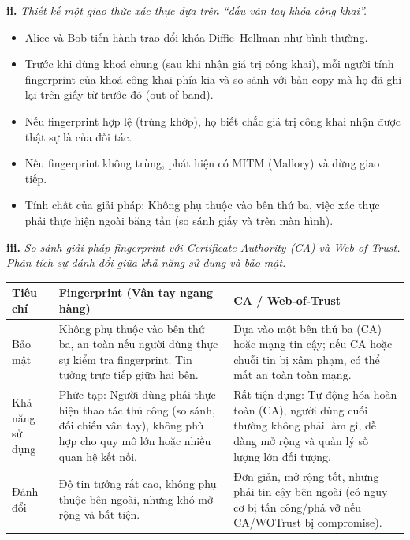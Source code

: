 \textbf{ii.} \textit{Thiết kế một giao thức xác thực dựa trên ``dấu vân tay khóa công khai''.}

\begin{itemize}
    \item Alice và Bob tiến hành trao đổi khóa Diffie–Hellman như bình thường.
    \item Trước khi dùng khoá chung (sau khi nhận giá trị công khai), mỗi người tính fingerprint của khoá công khai phía kia và so sánh với bản copy mà họ đã ghi lại trên giấy từ trước đó (out-of-band).
    \item Nếu fingerprint hợp lệ (trùng khớp), họ biết chắc giá trị công khai nhận được thật sự là của đối tác.
    \item Nếu fingerprint không trùng, phát hiện có MITM (Mallory) và dừng giao tiếp.
    \item Tính chất của giải pháp: Không phụ thuộc vào bên thứ ba, việc xác thực phải thực hiện ngoài băng tần (so sánh giấy và trên màn hình).
\end{itemize}

\textbf{iii.} \textit{So sánh giải pháp fingerprint với Certificate Authority (CA) và Web-of-Trust. Phân tích sự đánh đổi giữa khả năng sử dụng và bảo mật.}

\begin{center}
    \begin{tabular}{|p{}|p{}|p{}|}
    \hline
    \textbf{Tiêu chí} & \textbf{Fingerprint (Vân tay ngang hàng)} & \textbf{CA / Web-of-Trust} \\
    \hline
    Bảo mật & Không phụ thuộc vào bên thứ ba, an toàn nếu người dùng thực sự kiểm tra fingerprint. Tin tưởng trực tiếp giữa hai bên. & Dựa vào một bên thứ ba (CA) hoặc mạng tin cậy; nếu CA hoặc chuỗi tin bị xâm phạm, có thể mất an toàn toàn mạng. \\
    \hline
    Khả năng sử dụng & Phức tạp: Người dùng phải thực hiện thao tác thủ công (so sánh, đối chiếu vân tay), không phù hợp cho quy mô lớn hoặc nhiều quan hệ kết nối. & Rất tiện dụng: Tự động hóa hoàn toàn (CA), người dùng cuối thường không phải làm gì, dễ dàng mở rộng và quản lý số lượng lớn đối tượng. \\
    \hline
    Đánh đổi & Độ tin tưởng rất cao, không phụ thuộc bên ngoài, nhưng khó mở rộng và bất tiện. & Đơn giản, mở rộng tốt, nhưng phải tin cậy bên ngoài (có nguy cơ bị tấn công/phá vỡ nếu CA/WOTrust bị compromise). \\
    \hline
    \end{tabular}
\end{center}

